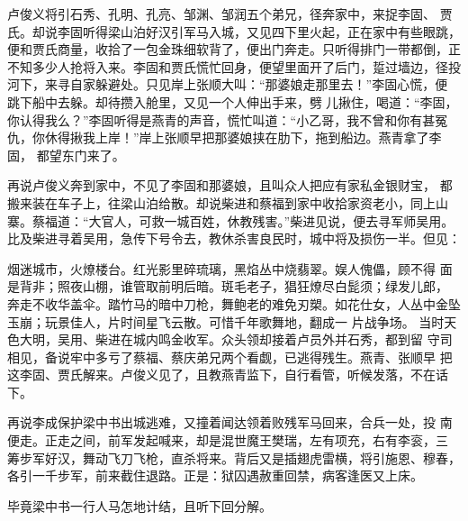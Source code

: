 卢俊义将引石秀、孔明、孔亮、邹渊、邹润五个弟兄，径奔家中，来捉李固、
贾氏。却说李固听得梁山泊好汉引军马入城，又见四下里火起，正在家中有些眼跳，
便和贾氏商量，收拾了一包金珠细软背了，便出门奔走。只听得排门一带都倒，正
不知多少人抢将入来。李固和贾氏慌忙回身，便望里面开了后门，踅过墙边，径投
河下，来寻自家躲避处。只见岸上张顺大叫：“那婆娘走那里去！”李固心慌，便
跳下船中去躲。却待攒入舱里，又见一个人伸出手来，劈儿揪住，喝道：“李固，
你认得我么？”李固听得是燕青的声音，慌忙叫道：“小乙哥，我不曾和你有甚冤
仇，你休得揪我上岸！”岸上张顺早把那婆娘挟在肋下，拖到船边。燕青拿了李固，
都望东门来了。

再说卢俊义奔到家中，不见了李固和那婆娘，且叫众人把应有家私金银财宝，
都搬来装在车子上，往梁山泊给散。却说柴进和蔡福到家中收拾家资老小，同上山
寨。蔡福道：“大官人，可救一城百姓，休教残害。”柴进见说，便去寻军师吴用。
比及柴进寻着吴用，急传下号令去，教休杀害良民时，城中将及损伤一半。但见：

烟迷城市，火燎楼台。红光影里碎琉璃，黑焰丛中烧翡翠。娱人傀儡，顾不得
面是背非；照夜山棚，谁管取前明后暗。斑毛老子，猖狂燎尽白髭须；绿发儿郎，
奔走不收华盖伞。踏竹马的暗中刀枪，舞鲍老的难免刃槊。如花仕女，人丛中金坠
玉崩；玩景佳人，片时间星飞云散。可惜千年歌舞地，翻成一
片战争场。
当时天色大明，吴用、柴进在城内鸣金收军。众头领却接着卢员外并石秀，都到留
守司相见，备说牢中多亏了蔡福、蔡庆弟兄两个看觑，已逃得残生。燕青、张顺早
把这李固、贾氏解来。卢俊义见了，且教燕青监下，自行看管，听候发落，不在话
下。

再说李成保护梁中书出城逃难，又撞着闻达领着败残军马回来，合兵一处，投
南便走。正走之间，前军发起喊来，却是混世魔王樊瑞，左有项充，右有李衮，三
筹步军好汉，舞动飞刀飞枪，直杀将来。背后又是插翅虎雷横，将引施恩、穆春，
各引一千步军，前来截住退路。正是：狱囚遇赦重回禁，病客逢医又上床。

毕竟梁中书一行人马怎地计结，且听下回分解。